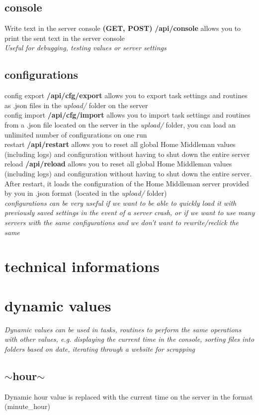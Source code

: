 \documentclass{article}
\begin{document}
\subsection{console}
Write text in the server console \textbf{(GET, POST)} \textbf{/api/console} allows you to print the sent text in the server console\\
\textit{Useful for debugging, testing values or server settings}
\subsection{configurations}
config export \textbf{/api/cfg/export} allows you to export task settings and routines as .json files in the \textit{upload/} folder on the server\\
config import \textbf{/api/cfg/import} allows you to import task settings and routines from a .json file located on the server in the \textit{upload/} folder, you can load an unlimited number of configurations on one run\\
restart \textbf{/api/restart} allows you to reset all global Home Middleman values (including logs) and configuration without having to shut down the entire server\\
reload \textbf{/api/reload} allows you to reset all global Home Middleman values (including logs) and configuration without having to shut down the entire server. After restart, it loads the configuration of the Home Middleman server provided by you in .json format (located in the \textit{upload/} folder)\\
\textit{configurations can be very useful if we want to be able to quickly load it with previously saved settings in the event of a server crash, or if we want to use many servers with the same configurations and we don't want to rewrite/reclick the same}
\section{technical informations}
\section{dynamic values}
\textit{Dynamic values can be used in tasks, routines to perform the same operations with other values, e.g. displaying the current time in the console, sorting files into folders based on date, iterating through a website for scrapping}
\subsection{$\sim$hour$\sim$}
Dynamic hour value is replaced with the current time on the server in the format (minute\_hour)
\end{document}

